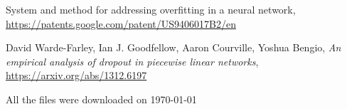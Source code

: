 \documentclass[licencjacka,en]{pracamgr}
\newcommand{\bibDownloadDate}{\today}
\begin{document}
\begin{thebibliography}{99}
         System and method for addressing overfitting in a neural network,  \href{https://patents.google.com/patent/US9406017B2/en}{https://patents.google.com/patent/US9406017B2/en}

		 David Warde-Farley, Ian J. Goodfellow, Aaron Courville, Yoshua Bengio, \textit{An empirical analysis of dropout in piecewise linear networks},  \href{https://arxiv.org/abs/1312.6197}{https://arxiv.org/abs/1312.6197}

	\end{thebibliography}
	All the files were downloaded on \bibDownloadDate
	
\end{document}
